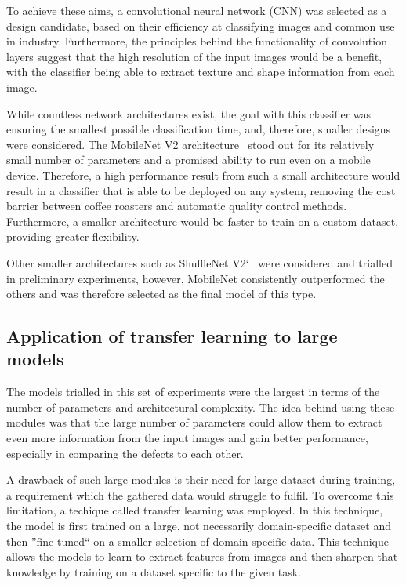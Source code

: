 To achieve these aims, a convolutional neural network (CNN) was selected as a design candidate, based on their
efficiency at classifying images and common use in industry.
Furthermore, the principles behind the functionality of convolution layers suggest that the high resolution of the input
images would be a benefit, with the classifier being able to extract texture and shape information from each image.

While countless network architectures exist, the goal with this classifier was ensuring the smallest possible classification time,
and, therefore, smaller designs were considered.
The MobileNet V2 architecture~\cite{mobileNet} stood out for its relatively small number of parameters and a promised ability to run even on
a mobile device.
Therefore, a high performance result from such a small architecture would result in a classifier that is able to be deployed
on any system, removing the cost barrier between coffee roasters and automatic quality control methods.
Furthermore, a smaller architecture would be faster to train on a custom dataset, providing greater flexibility.

Other smaller architectures such as ShuffleNet V2`~\cite{shuffleNet} were considered and trialled in preliminary experiments,
however, MobileNet consistently outperformed the others and was therefore selected as the final model of this type.
\subsection{Application of transfer learning to large models}
\label{subsec:transfer-learning}
The models trialled in this set of experiments were the largest in terms of the number of parameters and
architectural complexity.
The idea behind using these modules was that the large number of parameters could allow them to extract even more information
from the input images and gain better performance, especially in comparing the defects to each other.

A drawback of such large modules is their need for large dataset during training, a requirement which the gathered data would
struggle to fulfil.
To overcome this limitation, a techique called transfer learning was employed.
In this technique, the model is first trained on a large, not necessarily domain-specific dataset and then
''fine-tuned`` on a smaller selection of domain-specific data.
This technique allows the models to learn to extract features from images and then sharpen that knowledge by training on a dataset
specific to the given task.

